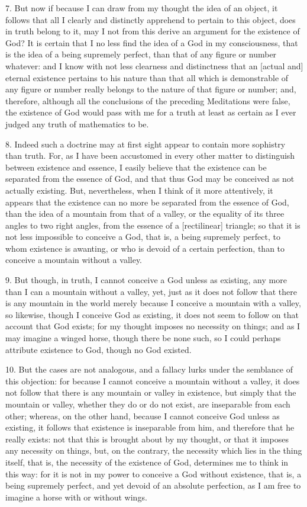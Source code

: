 7. But now if because I can draw from my thought the idea of an object, it follows that all I clearly and distinctly apprehend to pertain to this object, does in truth belong to it, may I not from this derive an argument for the existence of God? It is certain that I no less find the idea of a God in my consciousness, that is the idea of a being supremely perfect, than that of any figure or number whatever: and I know with not less clearness and distinctness that an [actual and] eternal existence pertains to his nature than that all which is demonstrable of any figure or number really belongs to the nature of that figure or number; and, therefore, although all the conclusions of the preceding Meditations were false, the existence of God would pass with me for a truth at least as certain as I ever judged any truth of mathematics to be.

8. Indeed such a doctrine may at first sight appear to contain more sophistry than truth. For, as I have been accustomed in every other matter to distinguish between existence and essence, I easily believe that the existence can be separated from the essence of God, and that thus God may be conceived as not actually existing. But, nevertheless, when I think of it more attentively, it appears that the existence can no more be separated from the essence of God, than the idea of a mountain from that of a valley, or the equality of its three angles to two right angles, from the essence of a [rectilinear] triangle; so that it is not less impossible to conceive a God, that is, a being supremely perfect, to whom existence is awanting, or who is devoid of a certain perfection, than to conceive a mountain without a valley.

9. But though, in truth, I cannot conceive a God unless as existing, any more than I can a mountain without a valley, yet, just as it does not follow that there is any mountain in the world merely because I conceive a mountain with a valley, so likewise, though I conceive God as existing, it does not seem to follow on that account that God exists; for my thought imposes no necessity on things; and as I may imagine a winged horse, though there be none such, so I could perhaps attribute existence to God, though no God existed.

10. But the cases are not analogous, and a fallacy lurks under the semblance of this objection: for because I cannot conceive a mountain without a valley, it does not follow that there is any mountain or valley in existence, but simply that the mountain or valley, whether they do or do not exist, are inseparable from each other; whereas, on the other hand, because I cannot conceive God unless as existing, it follows that existence is inseparable from him, and therefore that he really exists: not that this is brought about by my thought, or that it imposes any necessity on things, but, on the contrary, the necessity which lies in the thing itself, that is, the necessity of the existence of God, determines me to think in this way: for it is not in my power to conceive a God without existence, that is, a being supremely perfect, and yet devoid of an absolute perfection, as I am free to imagine a horse with or without wings.

